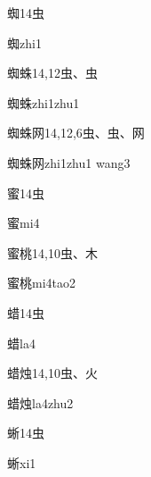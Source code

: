 \begin{Entry}{蜘}{14}{⾍}
  \begin{Phonetics}{蜘}{zhi1}
  \end{Phonetics}
\end{Entry}

\begin{Entry}{蜘蛛}{14,12}{⾍、⾍}
  \begin{Phonetics}{蜘蛛}{zhi1zhu1}
  \end{Phonetics}
\end{Entry}

\begin{Entry}{蜘蛛网}{14,12,6}{⾍、⾍、⽹}
  \begin{Phonetics}{蜘蛛网}{zhi1zhu1 wang3}
  \end{Phonetics}
\end{Entry}

\begin{Entry}{蜜}{14}{⾍}
  \begin{Phonetics}{蜜}{mi4}
  \end{Phonetics}
\end{Entry}

\begin{Entry}{蜜桃}{14,10}{⾍、⽊}
  \begin{Phonetics}{蜜桃}{mi4tao2}
  \end{Phonetics}
\end{Entry}

\begin{Entry}{蜡}{14}{⾍}
  \begin{Phonetics}{蜡}{la4}
  \end{Phonetics}
\end{Entry}

\begin{Entry}{蜡烛}{14,10}{⾍、⽕}
  \begin{Phonetics}{蜡烛}{la4zhu2}
  \end{Phonetics}
\end{Entry}

\begin{Entry}{蜥}{14}{⾍}
  \begin{Phonetics}{蜥}{xi1}
  \end{Phonetics}
\end{Entry}


